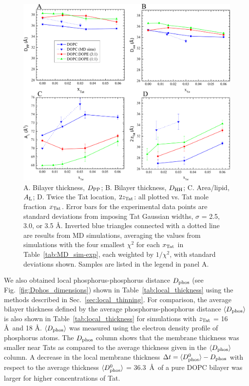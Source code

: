 \begin{figure}[htbp]
  \centering
  \includegraphics[width=\textwidth]{figures/Tat/MD_Results/DHH_DPP_AL_zTat}
  \caption[A. Bilayer thickness, $\DPP$; B. Bilayer thickness, $\DHH$; 
  C. Area/lipid, $\AL$; D. Twice the Tat location, $2\zTat$: all plotted vs. 
  Tat mole fraction $\xTat$]
  {A. Bilayer thickness, $\DPP$; B. Bilayer thickness, $\DHH$; 
  C. Area/lipid, $\AL$; D. Twice the Tat location, $2\zTat$: all plotted vs. 
  Tat mole fraction $\xTat$.  Error bars for the experimental data points 
  are standard deviations from imposing 
  Tat Gaussian widths, $\sigma$ = 2.5, 3.0, or 3.5 \AA.   
  Inverted blue triangles connected with a dotted line are results from MD simulations, 
  averaging the values from simulations with the four smallest $\chi^2$ for each $\xTat$
  in Table~\ref{tab:MD_sim-exp}, each weighted by $1/\chi^2$, 
  with standard deviations shown. 
  Samples are listed in the legend in panel A.}
  \label{fig:DHH_DPP_AL_zTat}
\end{figure}

\newpage
We also obtained local phosphorus-phosphorus distance $D_\text{phos}$
(see Fig.~\ref{fig:Dphos_dimensions})
shown in Table~\ref{tab:local_thickness} 
using the methods described in Sec.~\ref{sec:local_thinning}.
For comparison, 
the average bilayer thickness defined by the average phosphorus-phosphorus 
distance $\langle D_\text{phos}\rangle$ is also shown in Table~\ref{tab:local_thickness} 
for simulations with $z_\textrm{Tat}$ = 16 \AA\ and 18 \AA. 
$\langle D_\text{phos}\rangle$ was measured using
the electron density profile of phosphorus atoms. 
The $D_\text{phos}$ column shows that the membrane thickness
was smaller near Tats as compared to the average thickness given in the
$\langle D_\text{phos}\rangle$ column.
A decrease in the local membrane thickness 
$\Delta t = \langle D_\text{phos}^0\rangle - D_\text{phos}$
with respect to the average thickness $\langle D_\text{phos}^0\rangle$ = 36.3~\AA\ 
of a pure DOPC bilayer
was larger for higher concentrations of Tat.


